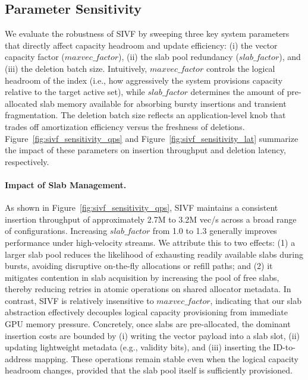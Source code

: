 \documentclass[sigconf,nonacm]{acmart}
\theoremstyle{plain}
\theoremstyle{definition}
\theoremstyle{remark}
\begin{document}
\subsection{Parameter Sensitivity}
\label{sec:eval_param_sensitivity}

We evaluate the robustness of SIVF by sweeping three key system parameters that directly affect capacity headroom and update efficiency: (i) the vector capacity factor ($maxvec\_factor$), (ii) the slab pool redundancy ($slab\_factor$), and (iii) the deletion batch size. Intuitively, $maxvec\_factor$ controls the logical headroom of the index (i.e., how aggressively the system provisions capacity relative to the target active set), while $slab\_factor$ determines the amount of pre-allocated slab memory available for absorbing bursty insertions and transient fragmentation. The deletion batch size reflects an application-level knob that trades off amortization efficiency versus the freshness of deletions. Figure~\ref{fig:sivf_sensitivity_qps} and Figure~\ref{fig:sivf_sensitivity_lat} summarize the impact of these parameters on insertion throughput and deletion latency, respectively.

\paragraph{Impact of Slab Management.}
As shown in Figure~\ref{fig:sivf_sensitivity_qps}, SIVF maintains a consistent insertion throughput of approximately 2.7M to 3.2M vec/s across a broad range of configurations. Increasing $slab\_factor$ from 1.0 to 1.3 generally improves performance under high-velocity streams. We attribute this to two effects: (1) a larger slab pool reduces the likelihood of exhausting readily available slabs during bursts, avoiding disruptive on-the-fly allocations or refill paths; and (2) it mitigates contention in slab acquisition by increasing the pool of free slabs, thereby reducing retries in atomic operations on shared allocator metadata.
In contrast, SIVF is relatively insensitive to $maxvec\_factor$, indicating that our slab abstraction effectively decouples logical capacity provisioning from immediate GPU memory pressure. Concretely, once slabs are pre-allocated, the dominant insertion costs are bounded by (i) writing the vector payload into a slab slot, (ii) updating lightweight metadata (e.g., validity bits), and (iii) inserting the ID-to-address mapping. These operations remain stable even when the logical capacity headroom changes, provided that the slab pool itself is sufficiently provisioned.
\end{document}
